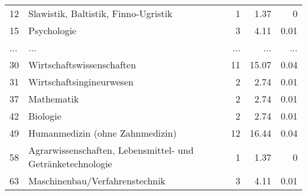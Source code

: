 \begin{longtable}{lXrrr}
        12 & \multicolumn{1}{X}{Slawistik, Baltistik, Finno-Ugristik} & %
          \num{1} &
          \num[round-mode=places,round-precision=2]{1,37} &
          \num[round-mode=places,round-precision=2]{0} \\
        15 & \multicolumn{1}{X}{Psychologie} & %
          \num{3} &
          \num[round-mode=places,round-precision=2]{4,11} &
          \num[round-mode=places,round-precision=2]{0,01} \\
       ... & ... & ... & ... & ... \\
        30 & \multicolumn{1}{X}{Wirtschaftswissenschaften} & %
          \num{11} &
          \num[round-mode=places,round-precision=2]{15,07} &
          \num[round-mode=places,round-precision=2]{0,04} \\

        31 & \multicolumn{1}{X}{Wirtschaftsingineurwesen} & %
          \num{2} &
          \num[round-mode=places,round-precision=2]{2,74} &
          \num[round-mode=places,round-precision=2]{0,01} \\

        37 & \multicolumn{1}{X}{Mathematik} & %
          \num{2} &
          \num[round-mode=places,round-precision=2]{2,74} &
          \num[round-mode=places,round-precision=2]{0,01} \\

        42 & \multicolumn{1}{X}{Biologie} & %
          \num{2} &
          \num[round-mode=places,round-precision=2]{2,74} &
          \num[round-mode=places,round-precision=2]{0,01} \\

        49 & \multicolumn{1}{X}{Humanmedizin (ohne Zahnmedizin)} & %
          \num{12} &
          \num[round-mode=places,round-precision=2]{16,44} &
          \num[round-mode=places,round-precision=2]{0,04} \\

        58 & \multicolumn{1}{X}{Agrarwissenschaften, Lebensmittel- und Getränketechnologie} & %
          \num{1} &
          \num[round-mode=places,round-precision=2]{1,37} &
          \num[round-mode=places,round-precision=2]{0} \\

        63 & \multicolumn{1}{X}{Maschinenbau/Verfahrenstechnik} & %
          \num{3} &
          \num[round-mode=places,round-precision=2]{4,11} &
          \num[round-mode=places,round-precision=2]{0,01} \\


\end{longtable}
